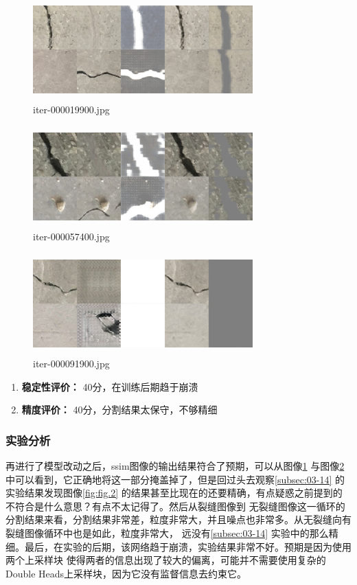 \begin{figure}[H]
	\centering
	\includegraphics[width=240pt,height=110pt]{0319//iter-000019900}
	\caption{iter-000019900.jpg}
	\label{fig:fig.5}
\end{figure}
\begin{figure}[H]
	\centering
	\includegraphics[width=240pt,height=110pt]{0319//iter-000057400}
	\caption{iter-000057400.jpg}
	\label{fig:fig.6}
\end{figure}
\begin{figure}[H]
	\centering
	\includegraphics[width=240pt,height=110pt]{0319//iter-000091900}
	\caption{iter-000091900.jpg}
\end{figure}


\begin{enumerate}[1.]
	\item \textbf{稳定性评价：} 40分，在训练后期趋于崩溃
	\item \textbf{精度评价：} 40分，分割结果太保守，不够精细
\end{enumerate}


\subsubsection{实验分析}

再进行了模型改动之后，ssim图像的输出结果符合了预期，可以从图像\ref{fig:fig.5} 与图像\ref{fig:fig.6}
中可以看到，它正确地将这一部分掩盖掉了，但是回过头去观察\ref{subsec:03-14} 的实验结果发现图像\ref{fig:fig.2}
的结果甚至比现在的还要精确，有点\colorbox{red!40}{疑惑}之前提到的不符合是什么意思？有点不太记得了。然后从裂缝图像到
无裂缝图像这一循环的分割结果来看，分割结果非常差，粒度非常大，并且噪点也非常多。从无裂缝向有裂缝图像循环中也是如此，粒度非常大，
远没有\ref{subsec:03-14} 实验中的那么精细。最后，在实验的后期，该网络趋于崩溃，实验结果非常不好。预期是因为使用两个上采样块
使得两者的信息出现了较大的偏离，可能并不需要使用复杂的Double Heads上采样块，因为它没有监督信息去约束它。

